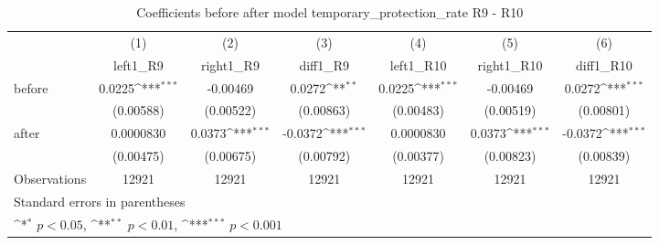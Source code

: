 \begin{table}[htbp]\centering
\def\sym#1{\ifmmode^{#1}\else\(^{#1}\)\fi}
\caption{Coefficients before after model temporary\_protection\_rate R9 - R10}
\begin{tabular}{l*{6}{c}}
\hline\hline
                    &\multicolumn{1}{c}{(1)}&\multicolumn{1}{c}{(2)}&\multicolumn{1}{c}{(3)}&\multicolumn{1}{c}{(4)}&\multicolumn{1}{c}{(5)}&\multicolumn{1}{c}{(6)}\\
                    &\multicolumn{1}{c}{left1\_R9}&\multicolumn{1}{c}{right1\_R9}&\multicolumn{1}{c}{diff1\_R9}&\multicolumn{1}{c}{left1\_R10}&\multicolumn{1}{c}{right1\_R10}&\multicolumn{1}{c}{diff1\_R10}\\
\hline
before              &      0.0225\sym{***}&    -0.00469         &      0.0272\sym{**} &      0.0225\sym{***}&    -0.00469         &      0.0272\sym{***}\\
                    &   (0.00588)         &   (0.00522)         &   (0.00863)         &   (0.00483)         &   (0.00519)         &   (0.00801)         \\
[1em]
after               &   0.0000830         &      0.0373\sym{***}&     -0.0372\sym{***}&   0.0000830         &      0.0373\sym{***}&     -0.0372\sym{***}\\
                    &   (0.00475)         &   (0.00675)         &   (0.00792)         &   (0.00377)         &   (0.00823)         &   (0.00839)         \\
\hline
Observations        &       12921         &       12921         &       12921         &       12921         &       12921         &       12921         \\
\hline\hline
\multicolumn{7}{l}{\footnotesize Standard errors in parentheses}\\
\multicolumn{7}{l}{\footnotesize \sym{*} \(p<0.05\), \sym{**} \(p<0.01\), \sym{***} \(p<0.001\)}\\
\end{tabular}
\end{table}
